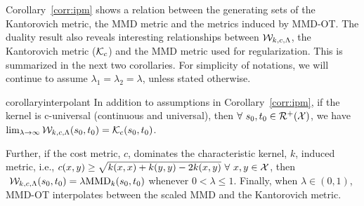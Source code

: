 Corollary~\ref{corr:ipm} shows a relation between the generating sets of the Kantorovich metric, the MMD metric and the metrics induced by MMD-OT.
The duality result also reveals interesting relationships between $\mathcal{W}_{k, c, \Lambda}$, the Kantorovich metric ($\mathcal{K}_c$) and the MMD metric used for regularization. This is summarized in the next two corollaries. For simplicity of notations, we will continue to assume $\lambda_1=\lambda_2=\lambda$, unless stated otherwise.
\begin{corollaryBox}
\begin{restatable}{corollary}{interpolant}
\label{interp} In addition to assumptions in Corollary~\ref{corr:ipm}, if the kernel is c-universal (continuous and universal), then $\forall\ s_0,t_0\in\calR^+(\calX)$, we have $\lim_{\lambda\rightarrow\infty}\mathcal{W}_{k, c, \Lambda}(s_0,t_0)=\mathcal{K}_c(s_0,t_0)$.  

Further, if the cost metric, $c$, dominates the characteristic kernel, $k$, induced metric, i.e., $c(x,y)\ge\sqrt{k(x,x)+k(y,y)-2k(x,y)}\ \forall\ x,y\in\calX$, then $\ \mathcal{W}_{k, c, \Lambda}(s_0, t_0)=\lambda \textup{MMD}_k(s_0, t_0)$ whenever $0<\lambda\leq 1$. Finally, when $\lambda\in(0,1)$, MMD-OT interpolates between the scaled MMD and the Kantorovich metric.
\end{restatable}
\end{corollaryBox}
